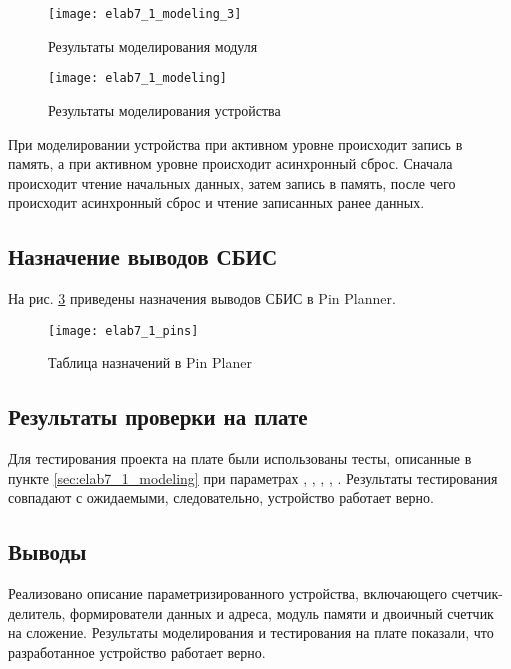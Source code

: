 \begin{figure}[H]
\begin{center}
	\texttt{[image: elab7\_1\_modeling\_3]}
	\caption{Результаты моделирования модуля }
	\label{fig:elab7_1_modeling_3}
\end{center}
\end{figure}

\begin{figure}[H]
\begin{center}
	\texttt{[image: elab7\_1\_modeling]}
	\caption{Результаты моделирования устройства}
	\label{fig:elab7_1_modeling}
\end{center}
\end{figure}

При моделировании устройства при активном уровне  происходит запись в память, а при активном уровне  происходит асинхронный сброс. Сначала происходит чтение начальных данных, затем запись в память, после чего происходит асинхронный сброс и чтение записанных ранее данных.

\subsection{Назначение выводов СБИС}

На рис. \ref{fig:elab7_1_pins} приведены назначения выводов СБИС в Pin Planner.

\begin{figure}[H]
\begin{center}
	\texttt{[image: elab7\_1\_pins]}
	\caption{Таблица назначений в Pin Planer}
	\label{fig:elab7_1_pins}
\end{center}
\end{figure}

\subsection{Результаты проверки на плате}

Для тестирования проекта на плате были использованы тесты, описанные в пункте \ref{sec:elab7_1_modeling} при параметрах , , , , . Результаты тестирования совпадают с ожидаемыми, следовательно, устройство работает верно.

\subsection{Выводы}

Реализовано описание параметризированного устройства, включающего счетчик-делитель, формирователи данных и адреса, модуль памяти и двоичный счетчик на сложение. Результаты моделирования и тестирования на плате показали, что разработанное устройство работает верно.

